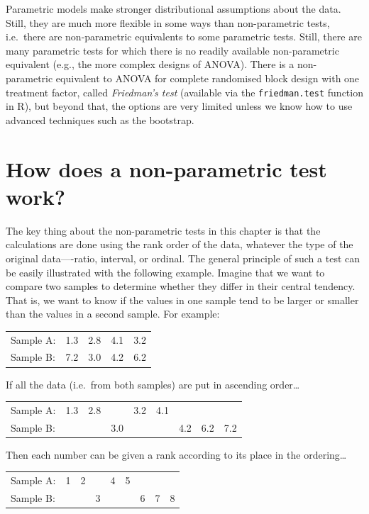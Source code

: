 \documentclass[
]{book}
\begin{document}
Parametric models make stronger distributional assumptions about the data. Still, they are much more flexible in some ways than non-parametric tests, i.e.~there are non-parametric equivalents to some parametric tests. Still, there are many parametric tests for which there is no readily available non-parametric equivalent (e.g., the more complex designs of ANOVA). There is a non-parametric equivalent to ANOVA for complete randomised block design with one treatment factor, called \emph{Friedman's test} (available via the \texttt{friedman.test} function in R), but beyond that, the options are very limited unless we know how to use advanced techniques such as the bootstrap.

\hypertarget{non-par-intro}{%
\section{How does a non-parametric test work?}\label{non-par-intro}}

The key thing about the non-parametric tests in this chapter is that the calculations are done using the rank order of the data, whatever the type of the original data----ratio, interval, or ordinal. The general principle of such a test can be easily illustrated with the following example. Imagine that we want to compare two samples to determine whether they differ in their central tendency. That is, we want to know if the values in one sample tend to be larger or smaller than the values in a second sample. For example:

\begin{longtable}[]{@{}lcccc@{}}
\toprule()
\endhead
Sample A: & 1.3 & 2.8 & 4.1 & 3.2 \\
Sample B: & 7.2 & 3.0 & 4.2 & 6.2 \\
\bottomrule()
\end{longtable}

If all the data (i.e.~from both samples) are put in ascending order\ldots{}

\begin{longtable}[]{@{}lcclcclll@{}}
\toprule()
\endhead
Sample A: & 1.3 & 2.8 & & 3.2 & 4.1 & & & \\
Sample B: & & & 3.0 & & & 4.2 & 6.2 & 7.2 \\
\bottomrule()
\end{longtable}

Then each number can be given a rank according to its place in the ordering\ldots{}

\begin{longtable}[]{@{}lcclcclll@{}}
\toprule()
\endhead
Sample A: & 1 & 2 & & 4 & 5 & & & \\
Sample B: & & & 3 & & & 6 & 7 & 8 \\
\bottomrule()
\end{longtable}
\end{document}
